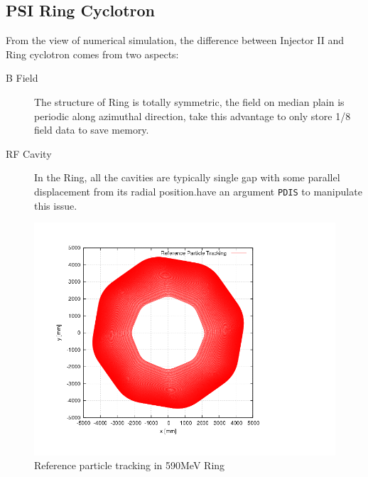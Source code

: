 \subsection{PSI  Ring Cyclotron}
\label{sec:Ring}
From the view of numerical simulation, the difference between Injector II and Ring cyclotron comes from two aspects:
\begin{description}
\item[B Field] The structure of Ring is totally symmetric, the field on median plain is periodic 
along azimuthal direction, \opalcycl take this advantage to only store 1/8 field data to save memory.

\item[RF Cavity] In the Ring, all the cavities are typically single gap with some parallel displacement from its
radial position.\opalcycl have an argument \texttt{PDIS} to manipulate this issue.  
\end{description}
\begin{figure}[ht]
  \begin{center} 
    \includegraphics[width=0.8\linewidth,angle=0]{figures/cyclotron/AEO_Ring.png}
    \caption{Reference particle tracking in 590MeV Ring}
    \label{fig:reference orbit}
  \end{center}
\end{figure}

